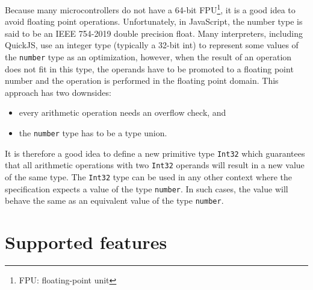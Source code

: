Because many microcontrollers do not have a 64-bit FPU\footnote{FPU: floating-point unit}, it is a good idea to avoid floating point operations. Unfortunately, in JavaScript, the number type is said to be an IEEE 754-2019 double precision float. Many interpreters, including QuickJS, use an integer type (typically a 32-bit int) to represent some values of the \texttt{number} type as an optimization, however, when the result of an operation does not fit in this type, the operands have to be promoted to a floating point number and the operation is performed in the floating point domain. This approach has two downsides:
\begin{itemize}
    \item every arithmetic operation needs an overflow check, and
    \item the \texttt{number} type has to be a type union.
\end{itemize}

It is therefore a good idea to define a new primitive type \texttt{Int32} which guarantees that all arithmetic operations with two \texttt{Int32} operands will result in a new value of the same type. The \texttt{Int32} type can be used in any other context where the specification expects a value of the type \texttt{number}. In such cases, the value will behave the same as an equivalent value of the type \texttt{number}.






\section{Supported features}
